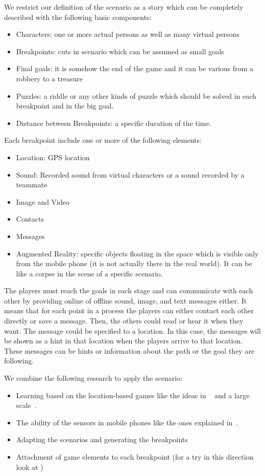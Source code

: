 \documentclass[conference]{IEEEtran}
\begin{document}
We restrict our definition of the scenario as a story which
can be completely described with the following basic components:
\begin{itemize}
\item Characters: one or more actual persons as well as many virtual persons
\item Breakpoints: cuts in scenario which can be assumed as small goals 
\item Final goals: it is somehow the end of the game and 
it can be various from a robbery to a treasure
\item Puzzles: a riddle or any other kinds of puzzle which should be solved in each 
      breakpoint and in the big goal.
\item Distance between Breakpoints: a specific duration of the time.
\end{itemize}

Each breakpoint include one or more of the following elements:
\begin{itemize}
\item Location: GPS location
\item Sound: Recorded sound from virtual characters or a sound
recorded by a teammate
\item Image and Video
\item Contacts
\item Messages
\item Augmented Reality: specific objects floating in the space which is 
visible only from the mobile phone (it is not actually there in the real world).
It can be like a corpse in the scene of a specific scenario.
\end{itemize}

 The players must reach the goals in each stage and can communicate with each other by providing online of offline sound, image, and text messages either. It means that for each point in a process the players can either contact each other directly or save a message. Then, the others could read or hear it when they want. The message could be specified to a location. In this case, the messages will be shown as a hint in that location when the players arrive to that location. These messages can be hints or information about the path or the goal they are following.

We combine the following research to apply the scenario:
\begin{itemize}
\item Learning based on the location-based games like the ideas in ~\cite{rexplorer} and 
a large scale~\cite{scal-loc-g}.
\item The ability of the sensors in mobile phones like the ones explained in~\cite{sensors}.
\item Adapting the scenarios and generating the breakpoints
\item Attachment of game elements to each breakpoint (for a try in this direction 
look at \cite{totem})
\end{itemize}
\end{document}

